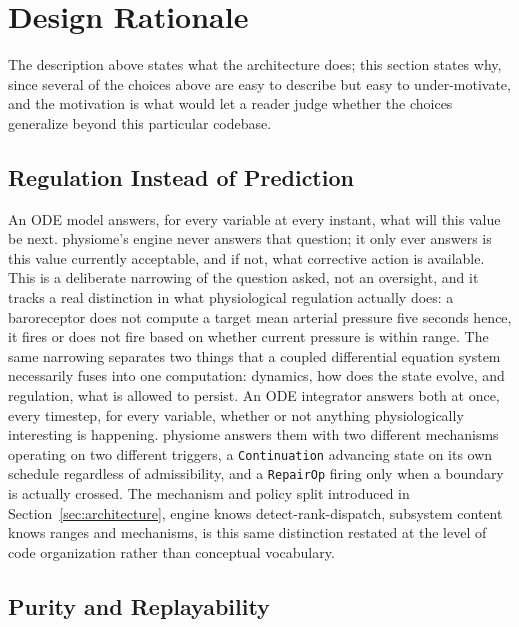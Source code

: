 \documentclass[11pt]{article}
\begin{document}
\section{Design Rationale}
\label{sec:rationale}

The description above states what the architecture does; this section states why, since several of the choices above are easy to describe but easy to under-motivate, and the motivation is what would let a reader judge whether the choices generalize beyond this particular codebase.

\subsection{Regulation Instead of Prediction}

An ODE model answers, for every variable at every instant, what will this value be next. physiome's engine never answers that question; it only ever answers is this value currently acceptable, and if not, what corrective action is available. This is a deliberate narrowing of the question asked, not an oversight, and it tracks a real distinction in what physiological regulation actually does: a baroreceptor does not compute a target mean arterial pressure five seconds hence, it fires or does not fire based on whether current pressure is within range. The same narrowing separates two things that a coupled differential equation system necessarily fuses into one computation: dynamics, how does the state evolve, and regulation, what is allowed to persist. An ODE integrator answers both at once, every timestep, for every variable, whether or not anything physiologically interesting is happening. physiome answers them with two different mechanisms operating on two different triggers, a \texttt{Continuation} advancing state on its own schedule regardless of admissibility, and a \texttt{RepairOp} firing only when a boundary is actually crossed. The mechanism and policy split introduced in Section~\ref{sec:architecture}, engine knows detect-rank-dispatch, subsystem content knows ranges and mechanisms, is this same distinction restated at the level of code organization rather than conceptual vocabulary.

\subsection{Purity and Replayability}
\end{document}
